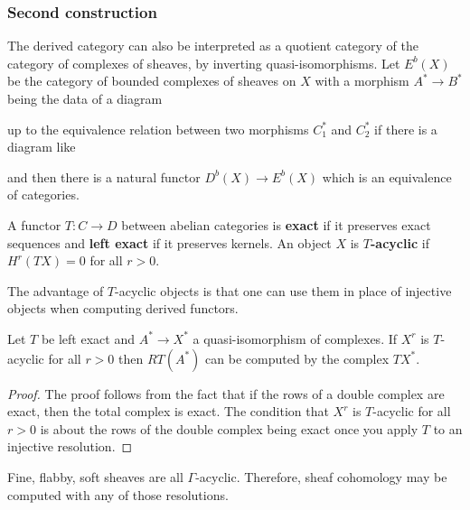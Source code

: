 \documentclass[12pt]{article}
\begin{document}
\begin{corollary}
\subsubsection{Second construction}
The derived category can also be interpreted as a quotient 
category of the category of complexes of sheaves, by inverting
quasi-isomorphisms. Let $E^b(X)$ be the category of bounded
complexes of sheaves on $X$ with a morphism $A^*\to B^*$ being the data of a diagram \begin{center}
\end{center} up to the equivalence relation between two morphisms $C^*_1$ and $C^*_2$ if there is 
a diagram like \begin{center}
\end{center}
and then there is a natural functor $D^b(X) \to E^b(X)$ which is an equivalence of categories. 

\begin{definition}
    A functor $T:C\to D$ between abelian categories is \textbf{exact}
    if it preserves exact sequences and \textbf{left exact} if it
    preserves kernels. An object $X$ is \textbf{$T$-acyclic} if $H^r(TX) = 0$
    for all $r>0$.
\end{definition}
The advantage of $T$-acyclic objects is that one can use them in place of injective objects
when computing derived functors. 

\begin{lemma}
    Let $T$ be left exact and $A^* \to X^*$ a quasi-isomorphism of complexes. 
    If $X^r$ is $T$-acyclic for all $r>0$ then $RT(A^*)$ can be computed by
    the complex $TX^*$.
\end{lemma}

\begin{proof}
    The proof follows from the fact that if the rows of a double complex are exact, then 
    the total complex is exact. The condition that $X^r$ is $T$-acyclic for all $r>0$ is about
    the rows of the double complex being exact once you apply $T$ to an injective resolution.
\end{proof}
\begin{remark}
    Fine, flabby, soft sheaves are all $\Gamma$-acyclic. Therefore, 
    sheaf cohomology may be computed with any of those resolutions.
\end{remark}
\end{corollary}
\end{document}
